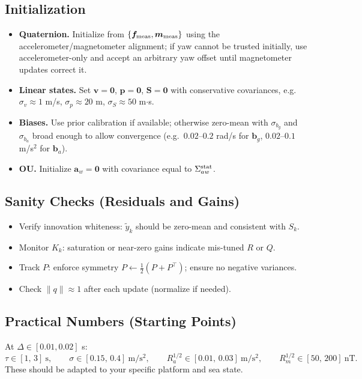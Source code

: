 \documentclass[10pt]{extarticle}
\begin{document}
\subsection{Initialization}
\begin{itemize}
\item \textbf{Quaternion.} Initialize from $\{\bm f_{\rm meas}, \bm m_{\rm meas}\}$ using the
accelerometer/magnetometer alignment; if yaw cannot be trusted initially, use accelerometer-only
and accept an arbitrary yaw offset until magnetometer updates correct it.
\item \textbf{Linear states.} Set $\bm v=\bm 0$, $\bm p=\bm 0$, $\bm S=\bm 0$ with conservative
covariances, e.g.\ $\sigma_v\!\approx\!1$ m/s, $\sigma_p\!\approx\!20$ m, $\sigma_S\!\approx\!50$ m$\cdot$s.
\item \textbf{Biases.} Use prior calibration if available; otherwise zero-mean with
$\sigma_{b_g}$ and $\sigma_{b_a}$ broad enough to allow convergence (e.g.\ $0.02$–$0.2$ rad/s for $\bm b_g$,
$0.02$–$0.1$ m/s$^2$ for $\bm b_a$).
\item \textbf{OU.} Initialize $\bm a_w=\bm 0$ with covariance equal to $\Sigma_{aw}^{\rm stat}$.
\end{itemize}

\subsection{Sanity Checks (Residuals and Gains)}
\begin{itemize}
\item Verify innovation whiteness: $\tilde y_k$ should be zero-mean and consistent with $S_k$.
\item Monitor $K_k$: saturation or near-zero gains indicate mis-tuned $R$ or $Q$.
\item Track $P$: enforce symmetry $P\leftarrow \tfrac12(P+P^\top)$; ensure no negative variances.
\item Check $\|q\| \approx 1$ after each update (normalize if needed).
\end{itemize}

\subsection{Practical Numbers (Starting Points)}
At $\Delta\in[0.01,0.02]$ s:
\[
\tau \in [1,\,3]\ \mathrm{s},\qquad
\sigma \in [0.15,\,0.4]\ \mathrm{m/s^2},\qquad
R_a^{1/2} \in [0.01,\,0.03]\ \mathrm{m/s^2},\qquad
R_m^{1/2} \in [50,\,200]\ \mathrm{nT}.
\]
These should be adapted to your specific platform and sea state.
\end{document}
